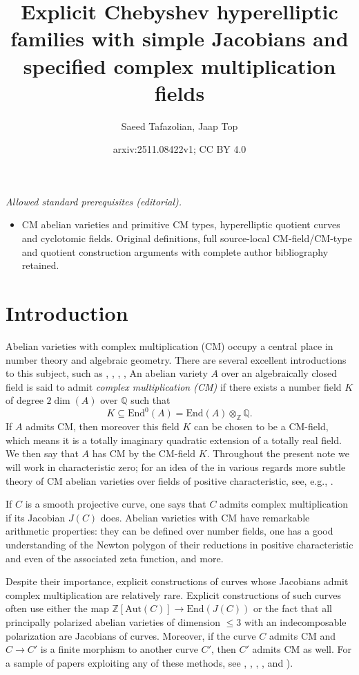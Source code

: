 \documentclass[a4paper,12pt]{amsart}
\title{Explicit Chebyshev hyperelliptic families with simple Jacobians and specified complex multiplication fields}
\author{Saeed Tafazolian, Jaap Top}
\date{arxiv:2511.08422v1; CC BY 4.0}
\newcommand{\ZZ}{{\mathbb Z}}
\newcommand{\QQ}{{\mathbb Q}}
\numberwithin{equation}{section}
\theoremstyle{plain}
\numberwithin{thm}{section}
\begin{document}
\maketitle
\noindent\textit{Allowed standard prerequisites (editorial).}\begin{itemize}
\item CM abelian varieties and primitive CM types, hyperelliptic quotient curves and cyclotomic fields. Original definitions, full source-local CM-field/CM-type and quotient construction arguments with complete author bibliography retained.
\end{itemize}\medskip
\section{Introduction}

Abelian varieties with complex multiplication (CM) occupy a central place in number theory and algebraic geometry. There are several excellent introductions to this subject,
such as \cite{ST}, \cite[Section~13.3]{BL}, \cite{Milne}, \cite{Lang}, An abelian variety $A$ over an algebraically closed field is said to admit \emph{complex multiplication (CM)} if there exists a number field $K$ of degree $2\dim(A)$ over $\QQ$ such that
\[
    K \subseteq \textrm{End}^0(A)=\textrm{End}(A)\otimes_\ZZ\QQ.
\]
If $A$ admits CM, then moreover this field $K$ can be chosen
to be a CM-field, which means it is a totally imaginary
quadratic extension of a totally real field. We then say
that $A$ has CM by the CM-field $K$. Throughout the
present note we will work in characteristic zero; for
an idea of the in various regards more subtle theory of
CM abelian varieties over fields of positive characteristic,
see, e.g., \cite{Oort}.

If $C$ is a smooth projective curve, one says that $C$ admits complex multiplication if its Jacobian $J(C)$ does.  Abelian varieties with CM have remarkable arithmetic properties: they can be defined over number fields, one has a good understanding of the Newton polygon of their reductions in
positive characteristic and even of the associated zeta function, and more.

Despite their importance, explicit constructions of curves whose Jacobians admit complex multiplication are relatively rare. 
Explicit constructions of such curves often use either the
map $\ZZ[\textrm{Aut}(C)]\to\textrm{End}(J(C))$ or the
fact that all principally polarized abelian varieties
of dimension $\leq 3$ with an indecomposable polarization
are Jacobians of curves. Moreover, if the curve $C$ admits
CM and $C\to C'$ is a finite morphism to another curve $C'$, then $C'$ admits CM as well. For a sample of papers
exploiting any
of these methods, see \cite{Ion}, \cite{BILV}, \cite{TTV}, \cite{CLR}, \cite{CMKT} and \cite[Theorem~5.2.10]{van}).
\end{document}
